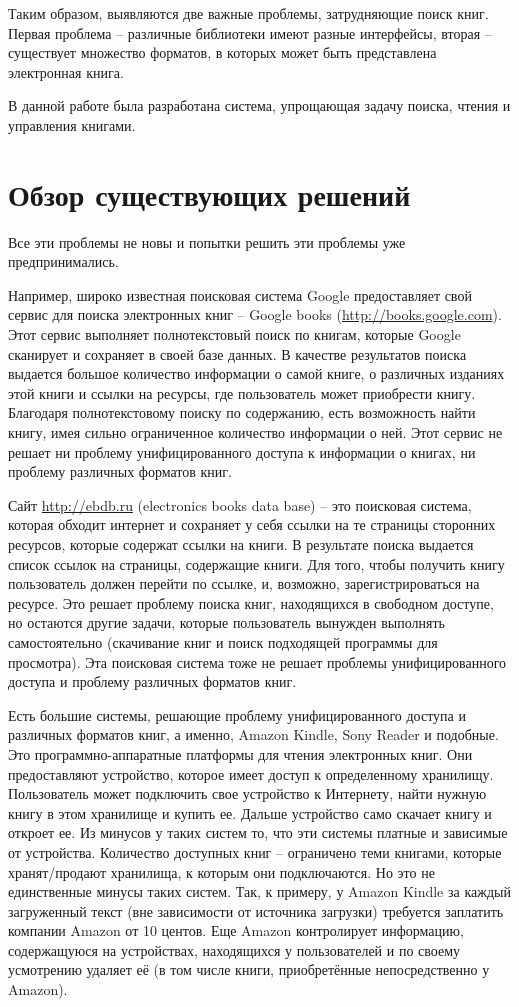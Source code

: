 Таким образом, выявляются две важные проблемы, затрудняющие поиск книг. Первая проблема -- различные библиотеки имеют разные интерфейсы, вторая -- существует множество форматов, в которых может быть представлена электронная книга. 

В данной работе была разработана система, упрощающая задачу поиска, чтения и управления книгами. 


\section{Обзор существующих решений}

Все эти проблемы не новы и попытки решить эти проблемы уже предпринимались.

Например, широко известная поисковая система Google предоставляет свой сервис для поиска электронных книг -- Google books (\url{http://books.google.com}). Этот сервис выполняет полнотекстовый поиск по книгам, которые Google сканирует и сохраняет в своей базе данных. В качестве результатов поиска выдается большое количество информации о самой книге, о различных изданиях этой книги и ссылки на ресурсы, где пользователь может приобрести книгу. Благодаря полнотекстовому поиску  по содержанию, есть возможность найти книгу, имея сильно ограниченное количество информации о ней. Этот сервис не решает ни проблему унифицированного доступа к информации о книгах, ни проблему различных форматов книг.

Сайт \url{http://ebdb.ru} (electronics books data base)  -- это поисковая система, которая обходит интернет и сохраняет у себя ссылки на те страницы сторонних ресурсов, которые содержат ссылки на книги. В результате поиска выдается список ссылок на страницы, содержащие книги. Для того, чтобы получить книгу пользователь должен перейти по ссылке, и, возможно, зарегистрироваться на ресурсе. Это решает проблему поиска книг, находящихся в свободном доступе, но остаются другие задачи, которые пользователь вынужден выполнять самостоятельно (скачивание книг и поиск подходящей программы для просмотра). Эта поисковая система тоже не решает проблемы унифицированного доступа и проблему различных форматов книг.

Есть большие системы, решающие проблему унифицированного доступа и различных форматов книг, а именно, Amazon Kindle, Sony Reader и подобные. 
Это программно-аппаратные платформы для чтения электронных книг. Они предоставляют устройство, которое имеет доступ к определенному хранилищу. Пользователь может подключить свое устройство к Интернету, найти нужную книгу в этом хранилище и купить ее. Дальше устройство само скачает книгу и откроет ее.
Из минусов у таких систем то, что эти системы платные и зависимые от устройства. Количество доступных книг -- ограничено теми книгами, которые хранят/продают хранилища, к которым они подключаются. Но это не единственные минусы таких систем. Так, к примеру, у Amazon Kindle за каждый загруженный текст (вне зависимости от источника загрузки) требуется заплатить компании Amazon от 10 центов. Еще Amazon контролирует информацию, содержащуюся на устройствах, находящихся у пользователей и по своему усмотрению удаляет её (в том числе книги, приобретённые непосредственно у Amazon).

